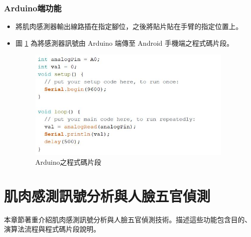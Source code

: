 \documentclass[12pt]{article}  %
\theoremstyle{plain}
\begin{document}
\subsubsection{Arduino端功能}
\begin{itemize}
\item 將肌肉感測器輸出線路插在指定腳位，之後將貼片貼在手臂的指定位置上。
\item 圖 \ref{Arduino之程式碼片段} 為將感測器訊號由 Arduino 端傳至 Android 手機端之程式碼片段。
\begin{figure}[htbp]
\centering
\includegraphics[width=10cm]{pic/ch2/code-Arduino.JPG}
\caption{Arduino之程式碼片段} \label{Arduino之程式碼片段}
\end{figure}
\end{itemize}
\newpage

\section{肌肉感測訊號分析與人臉五官偵測}
本章節著重介紹肌肉感測訊號分析與人臉五官偵測技術。描述這些功能包含目的、演算法流程與程式碼片段說明。
\end{document}
